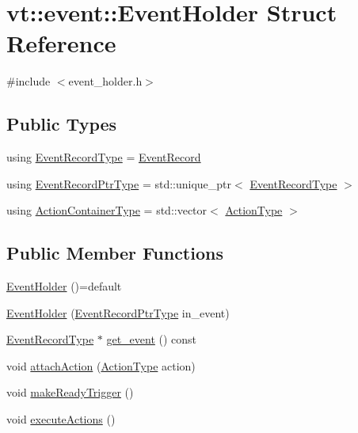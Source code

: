 \hypertarget{structvt_1_1event_1_1_event_holder}{}\section{vt\+:\+:event\+:\+:Event\+Holder Struct Reference}
\label{structvt_1_1event_1_1_event_holder}


{\ttfamily \#include $<$event\+\_\+holder.\+h$>$}

\subsection*{Public Types}
\begin{DoxyCompactItemize}
\item 
using \hyperlink{structvt_1_1event_1_1_event_holder_adfdec23d67b016b1f028694d5ca5bcff}{Event\+Record\+Type} = \hyperlink{structvt_1_1event_1_1_event_record}{Event\+Record}
\item 
using \hyperlink{structvt_1_1event_1_1_event_holder_a89949c85549018aad229356105187d50}{Event\+Record\+Ptr\+Type} = std\+::unique\+\_\+ptr$<$ \hyperlink{structvt_1_1event_1_1_event_holder_adfdec23d67b016b1f028694d5ca5bcff}{Event\+Record\+Type} $>$
\item 
using \hyperlink{structvt_1_1event_1_1_event_holder_ae0e2d5fe3bd5792118116105a0a09db7}{Action\+Container\+Type} = std\+::vector$<$ \hyperlink{namespacevt_ae0a5a7b18cc99d7b732cb4d44f46b0f3}{Action\+Type} $>$
\end{DoxyCompactItemize}
\subsection*{Public Member Functions}
\begin{DoxyCompactItemize}
\item 
\hyperlink{structvt_1_1event_1_1_event_holder_aba66e34b2e3f90d418430be281ccb9b1}{Event\+Holder} ()=default
\item 
\hyperlink{structvt_1_1event_1_1_event_holder_a11cef5f8c68e7052e0756c0a7506a278}{Event\+Holder} (\hyperlink{structvt_1_1event_1_1_event_holder_a89949c85549018aad229356105187d50}{Event\+Record\+Ptr\+Type} in\+\_\+event)
\item 
\hyperlink{structvt_1_1event_1_1_event_holder_adfdec23d67b016b1f028694d5ca5bcff}{Event\+Record\+Type} $\ast$ \hyperlink{structvt_1_1event_1_1_event_holder_ac679f89c2b133834d0a10181a80c5d47}{get\+\_\+event} () const
\item 
void \hyperlink{structvt_1_1event_1_1_event_holder_aa5563adb9da7193d0a8260424d756c51}{attach\+Action} (\hyperlink{namespacevt_ae0a5a7b18cc99d7b732cb4d44f46b0f3}{Action\+Type} action)
\item 
void \hyperlink{structvt_1_1event_1_1_event_holder_a6a9295755ee849b769c7e5ad1c25ee08}{make\+Ready\+Trigger} ()
\item 
void \hyperlink{structvt_1_1event_1_1_event_holder_a39cab4f8ac00152657fcb2e49497f049}{execute\+Actions} ()
\end{DoxyCompactItemize}


